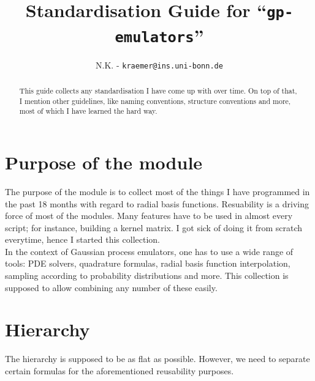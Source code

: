 \documentclass[11pt]{article}
\title{Standardisation Guide for ``\texttt{gp-emulators}''}
\author{N.K. - \texttt{kraemer@ins.uni-bonn.de}}
\begin{document}
\maketitle
\begin{abstract}
This guide collects any standardisation I have come up with over time. On top of that, I mention other guidelines, like naming conventions, structure conventions and more, most of which I have learned the hard way.
\end{abstract}
\begin{figure}[h]
\centering
\begin{minipage}{0.5\textwidth}
\tableofcontents
\end{minipage}
\end{figure}




\section{Purpose of the module}

The purpose of the module is to collect most of the things I have programmed in the past 18 months with regard to radial basis functions. Resuability is a driving force of most of the modules. Many features have to be used in almost every script; for instance, building a kernel matrix. I got sick of doing it from scratch everytime, hence I started this collection. \\

In the context of Gaussian process emulators, one has to use a wide range of tools: PDE solvers, quadrature formulas, radial basis function interpolation, sampling according to probability distributions and more. This collection is supposed to allow combining any number of these easily. 



\section{Hierarchy}
The hierarchy is supposed to be as flat as possible. However, we need to separate certain formulas for the aforementioned reusability purposes.
\end{document}
